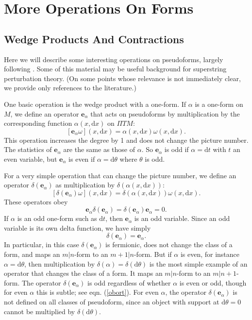 \documentclass[11pt,a4paper]{article}
\def\d{{\mathrm d}}
\def\e{{\mathbf e}}
\def\Pi{\varPi}
\begin{document}
\section{More Operations On Forms}\label{operations}

\subsection{Wedge Products And Contractions}\label{wedgep}

Here we will describe some interesting operations on pseudoforms, largely following \cite{Beltwo,Belthree}.     Some of this material may be
 useful background for superstring perturbation theory. (On some points whose relevance is not immediately clear, we provide only references
 to the literature.)

One basic operation is the wedge product with a one-form.  If $\alpha$ is a one-form on $M$, we define an operator $\e_\alpha$
that acts on pseudoforms by multiplication by the corresponding function $\alpha(x,\d x)$ on ${\Pi} TM$:
\begin{equation}\label{obz}[\e_\alpha\omega](x,\d x) =\alpha(x,\d x) \omega(x,\d x). \end{equation}
This operation increases the degree by 1 and does not change the picture number.  The statistics of $\e_\alpha$ are the same as 
those of $\alpha$.  So $\e_\alpha$ is odd if $\alpha=\d t$ with $t$ an even variable, but $\e_\alpha$ is even if $\alpha=\d\theta$ where $\theta$ is odd.

For a very simple operation that can change the picture number, we define an operator $\delta(\e_\alpha)$ as multiplication by $\delta(\alpha(x,\d x))$:
\begin{equation}\label{nobz}[\delta(\e_\alpha)\omega](x,\d x)=\delta(\alpha(x,\d x))\omega(x,\d x). \end{equation}
These operators obey
\begin{equation}\label{nobozx}\e_\alpha\delta(\e_\alpha)=\delta(\e_\alpha)\e_\alpha=0.\end{equation}
If $\alpha$ is an odd one-form such as $\d t$, then $\e_\alpha$ is an odd variable.  Since an odd variable is its own delta function, we have simply
\begin{equation}\label{ozo}\delta(\e_\alpha)=\e_\alpha. \end{equation}
In particular, in this case $\delta(\e_\alpha)$ is fermionic, does not change the class of a form, and maps an $m|n$-form to an $m+1|n$-form.
But if $\alpha$ is even, for instance $\alpha = \d\theta$, then multiplication by $\delta(\alpha)=\delta(\d\theta)$ is the most simple example
of an operator that changes the class of a form.  It maps an $m|n$-form to an $m|n+1$-form.  The operator $\delta(\e_\alpha)$ is odd regardless of whether
$\alpha$ is even or odd, though for even $\alpha$ this is subtle; see eqn. (\ref{obort}).   For even $\alpha$, the operator $\delta(\e_\alpha)$
is not defined on all classes of pseudoform, since an object with support at $\d\theta=0$ cannot be multiplied by $\delta(\d\theta)$.  
\end{document}
